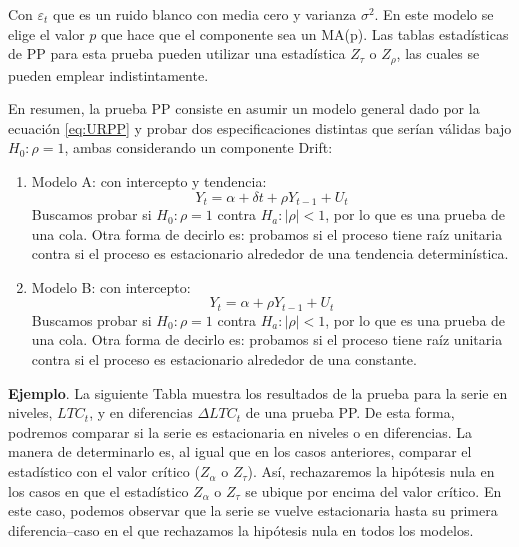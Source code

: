 \documentclass[
]{book}
\begin{document}
Con \(\varepsilon_t\) que es un ruido blanco con media cero y varianza \(\sigma^2\). En este modelo se elige el valor \(p\) que hace que el componente sea un MA(p). Las tablas estadísticas de PP para esta prueba pueden utilizar una estadística \(Z_\tau\) o \(Z_\rho\), las cuales se pueden emplear indistintamente.

En resumen, la prueba PP consiste en asumir un modelo general dado por la ecuación \eqref{eq:URPP} y probar dos especificaciones distintas que serían válidas bajo \(H_0 : \rho = 1\), ambas considerando un componente Drift:

\begin{enumerate}
\def\labelenumi{\arabic{enumi}.}
\item
  Modelo A: con intercepto y tendencia:
  \begin{equation*}
   Y_t = \alpha + \delta t + \rho Y_{t-1} + U_t
    \end{equation*}
  Buscamos probar si \(H_0 : \rho = 1\) contra \(H_a : | \rho | < 1\), por lo que es una prueba de una cola. Otra forma de decirlo es: probamos si el proceso tiene raíz unitaria contra si el proceso es estacionario alrededor de una tendencia determinística.
\item
  Modelo B: con intercepto:
  \begin{equation*}
   Y_t = \alpha + \rho Y_{t-1} + U_t
    \end{equation*}
  Buscamos probar si \(H_0 : \rho = 1\) contra \(H_a : | \rho | < 1\), por lo que es una prueba de una cola. Otra forma de decirlo es: probamos si el proceso tiene raíz unitaria contra si el proceso es estacionario alrededor de una constante.
\end{enumerate}

\textbf{Ejemplo}. La siguiente Tabla muestra los resultados de la prueba para la serie en niveles, \(LTC_t\), y en diferencias \(\Delta LTC_t\) de una prueba PP. De esta forma, podremos comparar si la serie es estacionaria en niveles o en diferencias. La manera de determinarlo es, al igual que en los casos anteriores, comparar el estadístico con el valor crítico (\(Z_\alpha\) o \(Z_\tau\)). Así, rechazaremos la hipótesis nula en los casos en que el estadístico \(Z_\alpha\) o \(Z_\tau\) se ubique por encima del valor crítico. En este caso, podemos observar que la serie se vuelve estacionaria hasta su primera diferencia--caso en el que rechazamos la hipótesis nula en todos los modelos.
\end{document}
